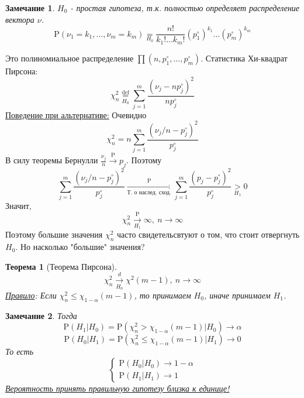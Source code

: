\documentclass[12pt]{article}
\newtheorem*{remark*}{Замечание}
\theoremstyle{basic_theorem}
\theoremstyle{name_theorem}
\newtheorem*{named_theorem}{Теорема}
\newcommand*{\defeq}{\stackrel{\text{def}}{=}}
\def\P{ \mathrm{P} }
\begin{document}
    \begin{remark*}
        $H_0$ - простая гипотеза, т.к. полностью определяет распределение
        вектора $\nu$.
        \[ \P(\nu_1=k_1,\ldots,\nu_m=k_m)\underset{H_0}{=}\frac{n!}{k_1!\ldots k_m!}(p_1^\circ)^{k_1}\ldots(p_m^\circ)^{k_m}\]
    \end{remark*}
    Это полиномиальное распределение $\prod(n,p_1^\circ, \ldots, p_m^\circ)$.
    Статистика Хи-квадрат Пирсона:
    \[\chi_n^2\underset{H_0}{\defeq}\sum_{j=1}^m\frac{(\nu_j-np_j^\circ)^2}{np_j^\circ}\]
    \underline{Поведение при альтернативе:} Очевидно
    \[\chi_n^2=n\sum_{j=1}^m\frac{(\nu_j/n-p_j^\circ)^2}{p_j^\circ}\]
    В силу теоремы Бернулли $\frac{\nu_j}{n}\xrightarrow{\P}p_j$.
    Поэтому
    \[\sum_{j=1}^m\frac{(\nu_j/n-p_j^\circ)^2}{p_j^\circ}\xrightarrow[\text{Т. о наслед. сход.}]{\P}\sum_{j=1}^m\frac{(p_j-p_j^\circ)^2}{p_j^\circ}\underset{H_1}{>}0\]
    Значит,
    \[\chi_n^2\xrightarrow[H_1]{\P}\infty,\ n\rightarrow\infty\]
    Поэтому большие значения $\chi_n^2$ часто свидетельсвтуют о том, что
    стоит отвергнуть $H_0$. Но насколько "большие" значения?
    \begin{named_theorem}[Теорема Пирсона]
        \[ \chi_n^2\xrightarrow[H_0]{d}\chi^2(m-1),\ n\rightarrow\infty \]
        \underline{Правило}: Если $\chi_n^2\leq\chi_{1-\alpha}(m-1)$, то принимаем $H_0$,
        иначе принимаем $H_1$.
    \end{named_theorem}
    \begin{remark*} Тогда
        \[\P(H_1\vert H_0)=\P(\chi^2_n>\chi_{1-\alpha}(m-1)\vert H_0)\rightarrow\alpha\]
        \[\P(H_0\vert H_1)=\P(\chi^2_n\leq\chi_{1-\alpha}(m-1)\vert H_1)\rightarrow0\]
        То есть
        \[\begin{cases}
            \P(H_0\vert H_0)\rightarrow1-\alpha \\
            \P(H_1\vert H_1)\rightarrow1
        \end{cases}\]
        \underline{Вероятность принять правильную гипотезу близка к единице!}
    \end{remark*}
\end{document}
